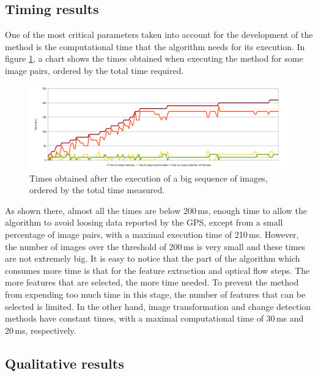 \subsection{Timing results}\label{ch:chapter01_02_03}

One of the most critical parameters taken into account for the development of the method is the computational time that the algorithm needs for its execution. In figure \ref{fig:cp01_times}, a chart shows the times obtained when executing the method for some image pairs, ordered by the total time required.

\begin{figure}[t]
\centering
\includegraphics[width=\textwidth]{times}
\caption{Times obtained after the execution of a big sequence of images, ordered by the total time measured.}\label{fig:cp01_times}
\end{figure}

As shown there, almost all the times are below 200\,ms, enough time to allow the algorithm to avoid loosing data reported by the \ac{GPS}, except from a small percentage of image pairs, with a maximal execution time of 210\,ms. However, the number of images over the threshold of 200\,ms is very small and these times are not extremely big. It is easy to notice that the part of the algorithm which consumes more time is that for the feature extraction and optical flow steps. The more features that are selected, the more time needed. To prevent the method from expending too much time in this stage, the number of features that can be selected is limited. In the other hand, image transformation and change detection methods have constant times, with a maximal computational time of 30\,ms and 20\,ms, respectively.

\subsection{Qualitative results}\label{ch:chapter01_02_04}

